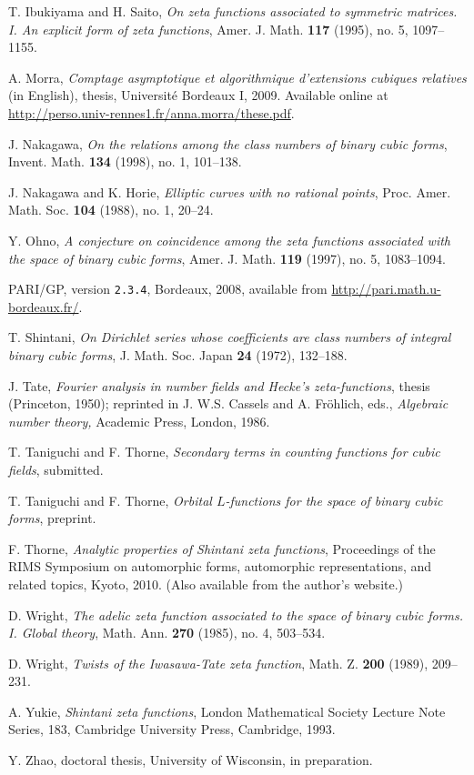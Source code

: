 \documentclass[12pt]{amsart}
\theoremstyle{remark}
\numberwithin{theorem}{section} \numberwithin{equation}{section}
\begin{document}
\begin{thebibliography}{99}
 T. Ibukiyama and H. Saito, \emph{On zeta functions associated to symmetric matrices. I. An explicit form of zeta functions},
Amer. J. Math. \textbf{117} (1995), no. 5, 1097--1155. 

 A. Morra,
\emph{Comptage asymptotique et algorithmique d'extensions cubiques relatives} (in English),
thesis, Universit\'e Bordeaux I, 2009. Available online at
\url{http://perso.univ-rennes1.fr/anna.morra/these.pdf}.

 J. Nakagawa, 
\emph{On the relations among the class numbers of binary cubic forms},
Invent. Math. \textbf{134} (1998), no. 1, 101--138. 

 J. Nakagawa and K. Horie,
\emph{Elliptic curves with no rational points},
Proc. Amer. Math. Soc. \textbf{104} (1988), no. 1, 20--24.

 Y. Ohno, 
\emph{A conjecture on coincidence among the zeta functions associated with the space of binary cubic forms},
Amer. J. Math. \textbf{119} (1997), no. 5, 1083--1094. 
 
PARI/GP, version {\tt 2.3.4}, Bordeaux, 2008, available from \url{http://pari.math.u-bordeaux.fr/}.

 T. Shintani,
\emph{On Dirichlet series whose coefficients are class numbers of integral binary cubic forms},
J. Math. Soc. Japan  \textbf{24} (1972), 132--188. 

 J. Tate,
\emph{Fourier analysis in number fields and Hecke's zeta-functions}, thesis (Princeton, 1950); reprinted in
J. W.S. Cassels and A. Fr\"ohlich, eds., 
\emph{Algebraic number theory,}
Academic Press, London, 1986.

 T. Taniguchi and F. Thorne, \emph{Secondary terms in counting functions for cubic fields}, submitted.

 T. Taniguchi and F. Thorne, 
\emph{Orbital $L$-functions for the space of binary cubic forms}, preprint.

 F. Thorne, \emph{Analytic properties of Shintani zeta functions}, 
Proceedings of the RIMS Symposium on automorphic forms, automorphic representations, and related topics, Kyoto, 2010.
(Also available from the author's website.)

 D. Wright,
\emph{The adelic zeta function associated to the space of binary cubic forms. I. Global theory},
Math. Ann.  \textbf{270}  (1985),  no. 4, 503--534.

 D. Wright,
\emph{Twists of the Iwasawa-Tate zeta function}, Math. Z. \textbf{200} (1989), 209--231.

 A. Yukie,
\emph{Shintani zeta functions},
London Mathematical Society Lecture Note Series, 183, Cambridge University Press, Cambridge, 1993.

 Y. Zhao,
doctoral thesis, University of Wisconsin, in preparation.

\end{thebibliography}
\end{document}
